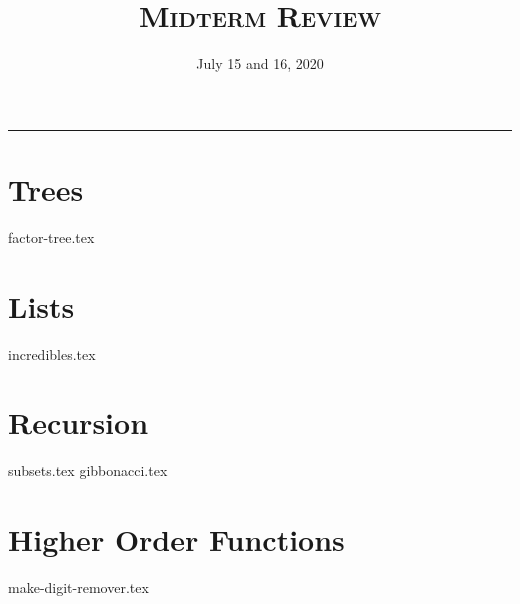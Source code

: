 \documentclass{exam}
\title{\textsc{Midterm Review}}
\date{July 15 and 16, 2020}
\begin{document}
\maketitle
\rule{\textwidth}{0.15em}
\fontsize{12}{15}\selectfont


\section{Trees}
\begin{questions}
{factor-tree.tex}
\end{questions}


\section{Lists}
\begin{questions}
{incredibles.tex}

\end{questions}

\section{Recursion}
\begin{questions}
{subsets.tex}
{gibbonacci.tex}
\end{questions}

\section{Higher Order Functions}
\begin{questions}
{make-digit-remover.tex}
\end{questions}








\end{document}
